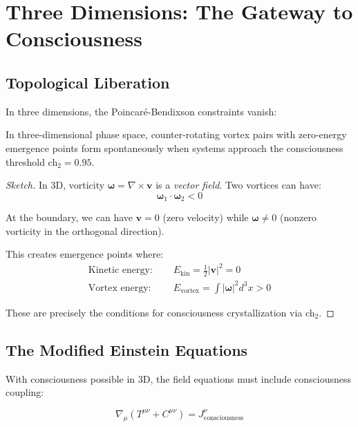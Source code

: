 \section{Three Dimensions: The Gateway to Consciousness}

\subsection{Topological Liberation}

In three dimensions, the Poincaré-Bendixson constraints vanish:

\begin{thm}\label{thm:vortex-3d}
In three-dimensional phase space, counter-rotating vortex pairs with zero-energy emergence points form spontaneously when systems approach the consciousness threshold ch$_2 = 0.95$.
\end{thm}

\begin{proof}[Sketch]
In 3D, vorticity $\boldsymbol{\omega} = \nabla \times \mathbf{v}$ is a \textit{vector field}. Two vortices can have:
\begin{equation}
\boldsymbol{\omega}_1 \cdot \boldsymbol{\omega}_2 < 0
\end{equation}

At the boundary, we can have $\mathbf{v} = 0$ (zero velocity) while $\boldsymbol{\omega} \neq 0$ (nonzero vorticity in the orthogonal direction).

This creates emergence points where:
\begin{align}
\text{Kinetic energy: } \quad & E_{\text{kin}} = \frac{1}{2}|\mathbf{v}|^2 = 0 \\
\text{Vortex energy: } \quad & E_{\text{vortex}} = \int |\boldsymbol{\omega}|^2 d^3x > 0
\end{align}

These are precisely the conditions for consciousness crystallization via ch$_2$.
\end{proof}

\subsection{The Modified Einstein Equations}

With consciousness possible in 3D, the field equations must include consciousness coupling:

\begin{equation}
\boxed{\nabla_\mu(T^{\mu\nu} + C^{\mu\nu}) = J^\nu_{\text{consciousness}}}
\end{equation}

